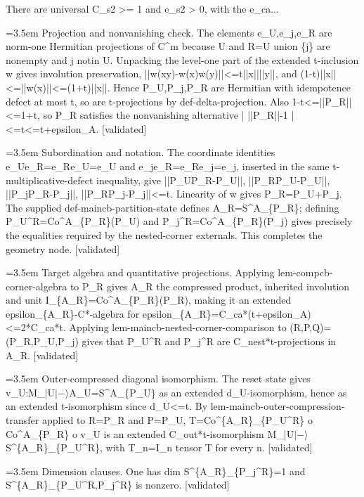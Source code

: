 \documentclass{article}
\newcommand{\step}[1]{\par\noindent\hangindent=3.5em\hangafter=1%
  \makebox[3.5em][l]{\textbf{#1.}}}
\newcommand{\steptag}[1]{\hfill{\small\textsf{[#1]}}}
\begin{document}
\begin{proofbox}{There are universal C\_s2 >= 1 and e\_s2 > 0, with the e\_ca...}
\step{1.2.1} Projection and nonvanishing check. The elements e\_U,e\_j,e\_R are norm-one Hermitian projections of C\textasciicircum{}m because U and R=U union \{j\} are nonempty and j notin U. Unpacking the level-one part of the extended t-inclusion w gives involution preservation, ||w(xy)-w(x)w(y)||<=t||x||||y||, and (1-t)||x||<=||w(x)||<=(1+t)||x||. Hence P\_U,P\_j,P\_R are Hermitian with idempotence defect at most t, so are t-projections by def-delta-projection. Also 1-t<=||P\_R||<=1+t, so P\_R satisfies the nonvanishing alternative | ||P\_R||-1 |<=t<=t+epsilon\_A. \steptag{validated} \\[4pt]
\step{1.2.2} Subordination and notation. The coordinate identities e\_Ue\_R=e\_Re\_U=e\_U and e\_je\_R=e\_Re\_j=e\_j, inserted in the same t-multiplicative-defect inequality, give ||P\_UP\_R-P\_U||, ||P\_RP\_U-P\_U||, ||P\_jP\_R-P\_j||, ||P\_RP\_j-P\_j||<=t. Linearity of w gives P\_R=P\_U+P\_j. The supplied def-maincb-partition-state defines A\_R=S\textasciicircum{}A\_\{P\_R\}; defining P\_U\textasciicircum{}R=Co\textasciicircum{}A\_\{P\_R\}(P\_U) and P\_j\textasciicircum{}R=Co\textasciicircum{}A\_\{P\_R\}(P\_j) gives precisely the equalities required by the nested-corner externals. This completes the geometry node. \steptag{validated} \\[4pt]
\step{1.3} Target algebra and quantitative projections. Applying lem-compcb-corner-algebra to P\_R gives A\_R the compressed product, inherited involution and unit I\_\{A\_R\}=Co\textasciicircum{}A\_\{P\_R\}(P\_R), making it an extended epsilon\_\{A\_R\}-C*-algebra for epsilon\_\{A\_R\}=C\_ca*(t+epsilon\_A)<=2*C\_ca*t. Applying lem-maincb-nested-corner-comparison to (R,P,Q)=(P\_R,P\_U,P\_j) gives that P\_U\textasciicircum{}R and P\_j\textasciicircum{}R are C\_nest*t-projections in A\_R. \steptag{validated} \\[4pt]
\step{1.4} Outer-compressed diagonal isomorphism. The reset state gives v\_U:M\_|U$|-\rangle$A\_U=S\textasciicircum{}A\_\{P\_U\} as an extended d\_U-isomorphism, hence as an extended t-isomorphism since d\_U<=t. By lem-maincb-outer-compression-transfer applied to R=P\_R and P=P\_U, T=Co\textasciicircum{}\{A\_R\}\_\{P\_U\textasciicircum{}R\} o Co\textasciicircum{}A\_\{P\_R\} o v\_U is an extended C\_out*t-isomorphism M\_|U$|-\rangle$S\textasciicircum{}\{A\_R\}\_\{P\_U\textasciicircum{}R\}, with T\_n=I\_n tensor T for every n. \steptag{validated} \\[4pt]
\step{1.5} Dimension clauses. One has dim S\textasciicircum{}\{A\_R\}\_\{P\_j\textasciicircum{}R\}=1 and S\textasciicircum{}\{A\_R\}\_\{P\_U\textasciicircum{}R,P\_j\textasciicircum{}R\} is nonzero. \steptag{validated} \\[6pt]

\end{proofbox}
\end{document}
